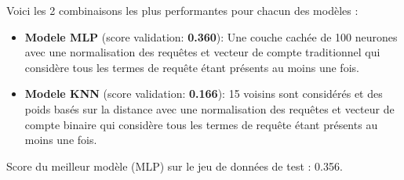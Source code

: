 Voici les 2 combinaisons les plus performantes pour chacun des modèles :

\begin{itemize}
  \item \textbf{Modele MLP} (score validation: \textbf{0.360}): Une couche cachée de 100 neurones avec une normalisation des requêtes et vecteur de compte traditionnel qui considère tous les termes de requête étant présents au moins une fois.
  \item \textbf{Modele KNN} (score validation: \textbf{0.166}): 15 voisins sont considérés et des poids basés sur la distance avec une normalisation des requêtes et vecteur de compte binaire qui considère tous les termes de requête étant présents au moins une fois.
\end{itemize}

Score du meilleur modèle (MLP) sur le jeu de données de test : 0.356.


